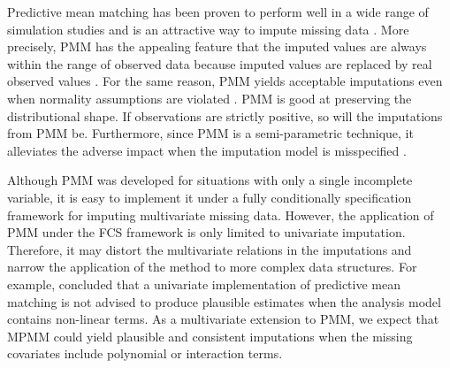 	Predictive mean matching has been proven to perform well in a wide range of simulation studies and is an attractive way to impute missing data \citep{Buuren2011, Vink2015, Heitjan1991, Morris2014, Vink2014}. More precisely, PMM has the appealing feature that the imputed values are always within the range of observed data because imputed values are replaced by real observed values \citep{Buuren2018}. For the same reason, PMM yields acceptable imputations even when normality assumptions are violated \citep{Vink2014}. PMM is good at preserving the distributional shape. If observations are strictly positive, so will the imputations from PMM be. Furthermore, since PMM is a semi-parametric technique, it alleviates the adverse impact when the imputation model is misspecified \citep{JamesR.Carpenter2013}. 
	
	Although PMM was developed for situations with only a single incomplete variable, it is easy to implement it under a fully conditionally specification framework for imputing multivariate missing data. However, the application of PMM under the FCS framework is only limited to univariate imputation. Therefore, it may distort the multivariate relations in the imputations and narrow the application of the method to more complex data structures. For example, \citet{seaman2012multiple} concluded that a univariate implementation of predictive mean matching is not advised to produce plausible estimates when the analysis model contains non-linear terms. As a multivariate extension to PMM, we expect that MPMM could yield plausible and consistent imputations when the missing covariates include polynomial or interaction terms.  
	
		
